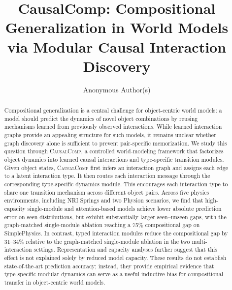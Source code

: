 \documentclass{article}
\title{CausalComp: Compositional Generalization in World Models \\ via Modular Causal Interaction Discovery}
\author{%
  Anonymous Author(s)
}
\newcommand{\ours}{\textsc{CausalComp}}
\begin{document}
\maketitle

\begin{abstract}
Compositional generalization is a central challenge for object-centric world models: a model should predict the dynamics of novel object combinations by reusing mechanisms learned from previously observed interactions. While learned interaction graphs provide an appealing structure for such models, it remains unclear whether graph discovery alone is sufficient to prevent pair-specific memorization. 
We study this question through \ours{}, a controlled world-modeling framework that factorizes object dynamics into learned causal interactions and type-specific transition modules. 
Given object states, \ours{} first infers an interaction graph and assigns each edge to a latent interaction type. It then routes each interaction message through the corresponding type-specific dynamics module. This encourages each interaction type to share one transition mechanism across different object pairs.
Across five physics environments, including NRI Springs and two Physion scenarios, we find that high-capacity single-module and attention-based models achieve lower absolute prediction error on seen distributions, but exhibit substantially larger seen--unseen gaps, with the graph-matched single-module ablation reaching a 75\% compositional gap on SimplePhysics. In contrast, typed interaction modules reduce the compositional gap by 31--34\% relative to the graph-matched single-module ablation in the two multi-interaction settings. Representation and capacity analyses further suggest that this effect is not explained solely by reduced model capacity. These results do not establish state-of-the-art prediction accuracy; instead, they provide empirical evidence that type-specific modular dynamics can serve as a useful inductive bias for compositional transfer in object-centric world models.
\end{abstract}

\end{document}
